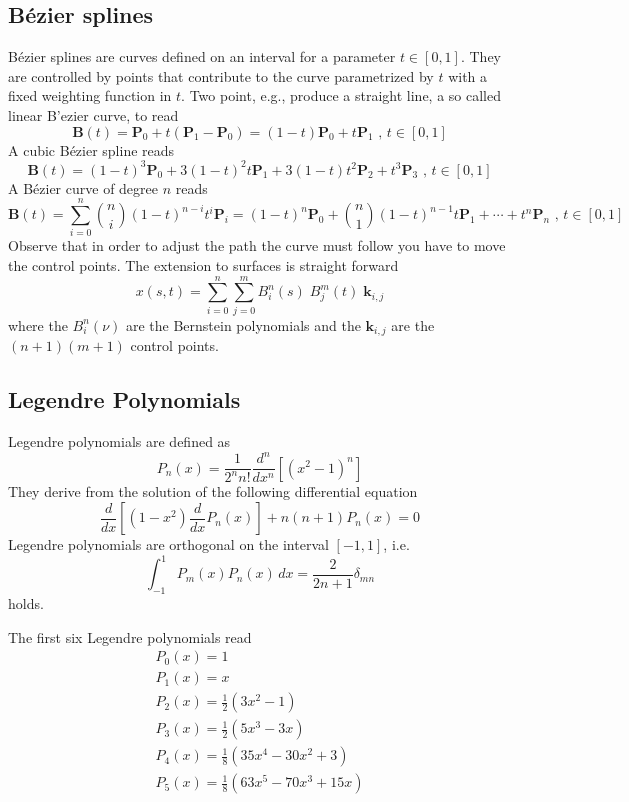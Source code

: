 \subsection{B\'ezier splines}
B\'ezier splines are curves defined on an interval for a parameter $t\in [0,1]$.
They are controlled by points that contribute to the curve parametrized by $t$
with a fixed weighting function in $t$. Two point, e.g., produce a straight
line, a so called linear B'ezier curve, to read
\[     \mathbf{B}(t)=\mathbf{P}_0 + t(\mathbf{P}_1-\mathbf{P}_0)=(1-t)\mathbf{P}_0 + t\mathbf{P}_1 \mbox{ , } t \in [0,1] \]
A cubic B\'ezier spline reads
\[     \mathbf{B}(t)=(1-t)^3\mathbf{P}_0+3(1-t)^2t\mathbf{P}_1+3(1-t)t^2\mathbf{P}_2+t^3\mathbf{P}_3 \mbox{ , } t \in [0,1]\]
A B\'ezier curve of degree $n$ reads
\[ \mathbf{B}(t)=\sum_{i=0}^n \binom{n}{i}(1-t)^{n-i}t^i\mathbf{P}_i =(1-t)^n\mathbf{P}_0+\binom{n}{1}(1-t)^{n-1}t\mathbf{P}_1+\cdots+t^n\mathbf{P}_n \mbox{ , } t \in [0,1]\]
Observe that in order to adjust the path the curve must follow you have to move
the control points. The extension to surfaces is straight forward
\[ x(s,t)=\sum_{i=0}^n \sum_{j=0}^m B_i^n(s) \; B_j^m(t) \; \mathbf{k}_{i,j}\]
where the $B_i^n(\nu)$ are the Bernstein polynomials and the $\mathbf{k}_{i,j}$ are the $(n+1)(m+1)$ control points.
\subsection{Legendre Polynomials}
Legendre polynomials are defined as
\begin{equation}
	    P_n(x) = \frac{1}{2^n n!}\frac{d^n}{dx^n } \left[ (x^2 -1)^n \right]
	\label{eq:legendre}
\end{equation}
They derive from the solution of the following differential equation
\[\frac{d}{dx} \left[ (1-x^2)\frac{d}{dx} P_n(x) \right] + n(n+1)P_n(x) = 0\]
Legendre polynomials are orthogonal on the interval $[-1,1]$, i.e.
\[     \int_{-1}^{1} P_m(x) P_n(x)\,dx = \frac{2}{2n + 1} \delta_{mn} \]
holds.

The first six Legendre polynomials read
\begin{eqnarray*}
 	P_0(x)=1\\
	P_1(x)=x\\
	P_2(x)=\frac{1}{2} (3x^2-1) \\
	P_3(x)=\frac{1}{2} (5x^3-3x) \\
	P_4(x)=\frac{1}{8} (35x^4-30x^2+3)\\
	P_5(x)=\frac{1}{8} (63x^5-70x^3+15x)
\end{eqnarray*}
\newpage